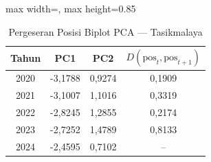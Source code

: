 \begin{table}[H]
\centering
\caption{Pergeseran Posisi Biplot PCA --- Tasikmalaya} \label{tab:appjarak_pca_skor_tasikmalaya}
\begin{adjustbox}{max width=\textwidth, max height=0.85\textheight}
\begin{tabular}{|c|c|c|c|}
\hline
\textbf{Tahun} & \textbf{PC1} & \textbf{PC2} & \textbf{$D(\text{pos}_t, \text{pos}_{t+1})$} \\
\hline
2020 & -3,1788 & 0,9274 & 0,1909 \\
2021 & -3,1007 & 1,1016 & 0,3319 \\
2022 & -2,8245 & 1,2855 & 0,2174 \\
2023 & -2,7252 & 1,4789 & 0,8133 \\
2024 & -2,4595 & 0,7102 & -- \\
\hline
\end{tabular}
\end{adjustbox}
\end{table}